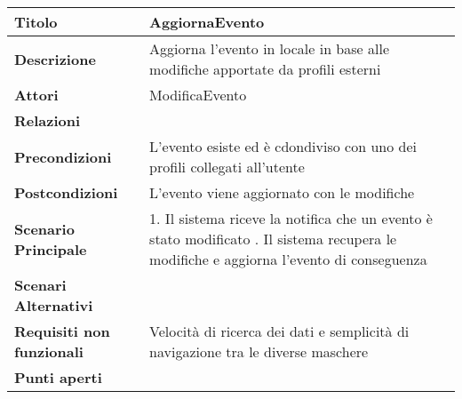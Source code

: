 \begin{tabular} {|P{4.5cm}|P{12.5cm}|}
  \hline
  \textbf{Titolo}                   & AggiornaEvento                                                                   \\
  \hline
  \textbf{Descrizione}              & Aggiorna l’evento in locale in base alle modifiche apportate da profili esterni  \\
  \hline
  \textbf{Attori}                   & ModificaEvento                                                                   \\
  \hline
  \textbf{Relazioni}                &                                                                                  \\
  \hline
  \textbf{Precondizioni}            & L'evento esiste ed è cdondiviso con uno dei profili collegati all'utente         \\
  \hline
  \textbf{Postcondizioni}           & L'evento viene aggiornato con le modifiche                                       \\
  \hline
  \textbf{Scenario Principale}      & 1. Il sistema riceve la notifica che un evento è stato modificato . Il sistema recupera le modifiche e aggiorna l'evento di conseguenza                                               \\
  \hline
  \textbf{Scenari Alternativi}      &                                                                                  \\
  \hline
  \textbf{Requisiti non funzionali} & Velocità di ricerca dei dati e semplicità di navigazione tra le diverse maschere \\
  \hline
  \textbf{Punti aperti}             &                                                                                  \\
  \hline
\end{tabular}
\hfill
\break

